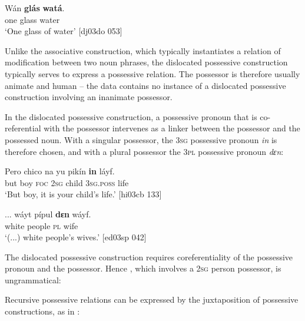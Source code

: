 \ea%
    \label{ex:key:237}
    \gll Wán    \textbf{glás}    \textbf{watá}.\\
one    glass  water\\

\glt ‘One glass of water’ [dj03do 053]
\z

Unlike the associative construction, which typically instantiates a relation of modification between two noun phrases, the dislocated possessive construction typically serves to express a possessive relation. The possessor is therefore usually animate and human – the data contains no instance of a dislocated possessive construction involving an inanimate possessor. 


In the dislocated possessive construction, a possessive pronoun that is co-referential with the possessor intervenes as a linker between the possessor and the possessed noun. With a singular possessor, the \textsc{3sg} possessive pronoun \textit{in} is therefore chosen, and with a plural possessor the \textsc{3pl} possessive pronoun \textit{dɛn}: 



\ea%
    \label{ex:key:238}
    \gll Pero    chico  na  yu  pikín  \textbf{in}    láyf.\\
but    boy    \textsc{foc}  \textsc{2sg}  child  \textsc{3sg.poss}  life\\

\glt ‘But boy, it is your child’s life.’ [hi03cb 133]
\z


\ea%
    \label{ex:key:239}
    \gll \op...\cp{}  wáyt  pípul  \textbf{dɛn}  wáyf.\\
{} white  people  \textsc{pl}  wife\\

\glt ‘(...) white people’s wives.’ [ed03sp 042]
\z

The dislocated possessive construction requires coreferentiality of the possessive pronoun and the possessor. Hence , which involves a \textsc{2sg} person possessor, is ungrammatical:


\z

Recursive possessive relations can be expressed by the juxtaposition of possessive constructions, as in : 


